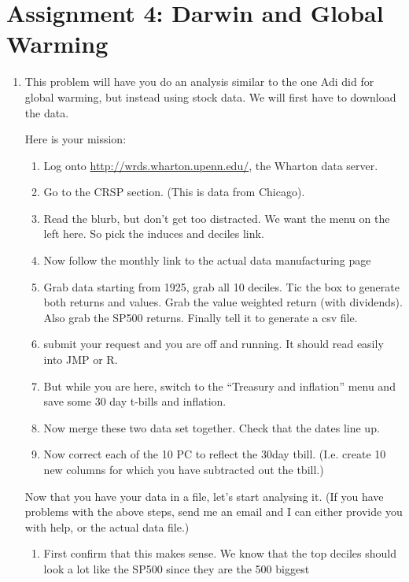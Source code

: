 \documentclass[11pt]{article}
\begin{document}
\section*{Assignment 4: Darwin and Global Warming}


\begin{enumerate}

\item This problem will have you do an analysis similar to the one Adi
did for global warming, but instead using stock data.  We will first
have to download the data.  

Here is your mission:
\begin{enumerate}[step 1:]
\item Log onto
\href{http://wrds.wharton.upenn.edu/}{http://wrds.wharton.upenn.edu/},
the Wharton data server.
\item Go to the CRSP section. (This is data from Chicago).
\item Read the blurb, but don't get too distracted.  We want the menu
on the left here.  So pick the induces and deciles link.
\item Now follow the monthly link to the actual data manufacturing page
\item Grab data starting from 1925, grab all 10 deciles.  Tic the box
to generate both returns and values.  Grab the
value weighted return (with dividends).  Also grab the SP500 returns.
Finally tell it to generate a csv file.
\item submit your request and you are off and running.  It should read
easily into JMP or R.
\item But while you are here, switch to the ``Treasury and inflation''
menu and save some 30 day t-bills and inflation.
\item Now merge these two data set together.  Check that the dates line up.
\item Now correct each of the 10 PC to reflect the 30day tbill.
(I.e. create 10 new columns for which you have subtracted out the tbill.)
\end{enumerate}
Now that you have your data in a file, let's start analysing it.  (If
you have problems with the above steps, send me an email and I can
either provide you with help, or the actual data file.)
\begin{enumerate}
\item First confirm that this makes sense.  We know that the top
deciles should look a lot like the SP500 since they are the 500 biggest

\end{enumerate}
\end{enumerate}
\end{document}
